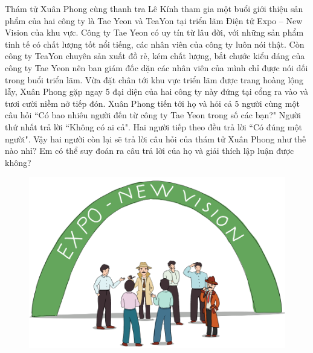 \begin{multicols}{2}
	Thám tử Xuân Phong cùng thanh tra Lê Kính tham gia một buổi giới thiệu sản phẩm của hai công ty là Tae Yeon và TeaYon tại triển lãm Điện tử Expo -- New Vision của khu vực. Công ty  Tae Yeon có uy tín từ lâu đời, với những sản phẩm tinh tế có chất lượng tốt nổi tiếng,  các nhân viên của công ty luôn nói thật. Còn công ty TeaYon chuyên sản xuất đồ rẻ, kém chất lượng, bắt chước kiểu dáng của công ty Tae Yeon nên ban giám đốc dặn các nhân viên của mình chỉ được nói dối trong buổi triển lãm. 
	\vskip 0.1cm
	Vừa đặt chân tới khu vực triển lãm được trang hoàng lộng lẫy, Xuân Phong gặp ngay $5$ đại diện  của hai công ty này đứng tại cổng ra vào và tươi cười niềm nở tiếp đón. Xuân Phong tiến tới họ và hỏi cả $5$ người cùng một câu hỏi ``Có bao nhiêu người đến từ công ty Tae Yeon trong số các bạn?" 
	\vskip 0.1cm
	Người thứ nhất trả lời ``Không có ai cả". Hai người tiếp theo đều trả lời ``Có đúng một người". 
	\vskip 0.1cm
	Vậy hai người còn lại sẽ trả lời câu hỏi của thám tử Xuân Phong như thế nào nhỉ? Em có thể suy đoán ra câu trả lời của họ và giải thích lập luận được không?
	\begin{figure}[H]
		\centering
		\vspace*{-5pt}
		\captionsetup{labelformat= empty, justification=centering}
		\includegraphics[width=1\linewidth]{xuanphong}
		\vspace*{-5pt}
	\end{figure}
\end{multicols}

